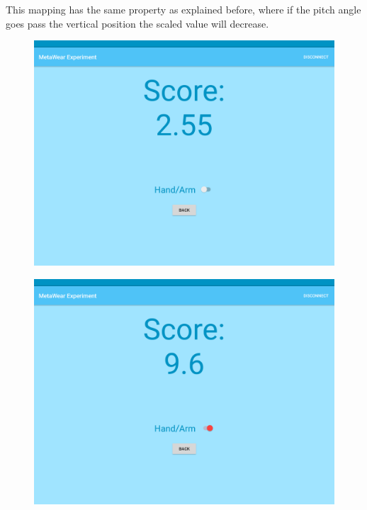 This mapping has the same property as explained before, where if the pitch angle goes pass the vertical position the scaled value will decrease.




\begin{figure}[h!]
\centering
\begin{minipage}{.55\textwidth}
  \centering
  \includegraphics[width=0.95\linewidth]{figures/tablet_screen3.png}
  \label{app_train_wrist}
\end{minipage}%
\begin{minipage}{.55\textwidth}
  \centering
  \includegraphics[width=0.95\linewidth]{figures/tablet_screen4.png}
  \label{app_train_arm}
\end{minipage}
\end{figure}

